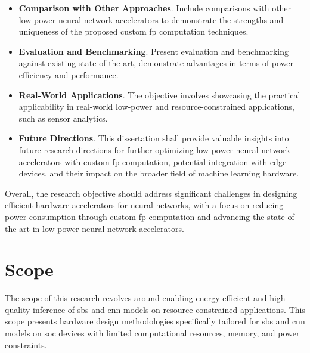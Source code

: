 \begin{itemize}
	\item \textbf{Comparison with Other Approaches}. Include comparisons with other low-power neural network accelerators to demonstrate the strengths and uniqueness of the proposed custom \gls{fp} computation techniques.
		\item \textbf{Evaluation and Benchmarking}. Present evaluation and benchmarking against existing state-of-the-art, demonstrate advantages in terms of power efficiency and performance.
	\item \textbf{Real-World Applications}. The objective involves showcasing the practical applicability in real-world low-power and resource-constrained applications, such as sensor analytics.
	\item \textbf{Future Directions}. This dissertation shall provide valuable insights into future research directions for further optimizing low-power neural network accelerators with custom \gls{fp} computation, potential integration with edge devices, and their impact on the broader field of machine learning hardware.
\end{itemize}

Overall, the research objective should address significant challenges in designing efficient hardware accelerators for neural networks, with a focus on reducing power consumption through custom \gls{fp} computation and advancing the state-of-the-art in low-power neural network accelerators.


\section{Scope}\label{chap1.scope}
The scope of this research revolves around enabling energy-efficient and high-quality inference of \gls{sbs} and \gls{cnn} models on resource-constrained applications. This scope presents hardware design methodologies specifically tailored for \gls{sbs} and \gls{cnn} models on \gls{soc} devices with limited computational resources, memory, and power constraints.



